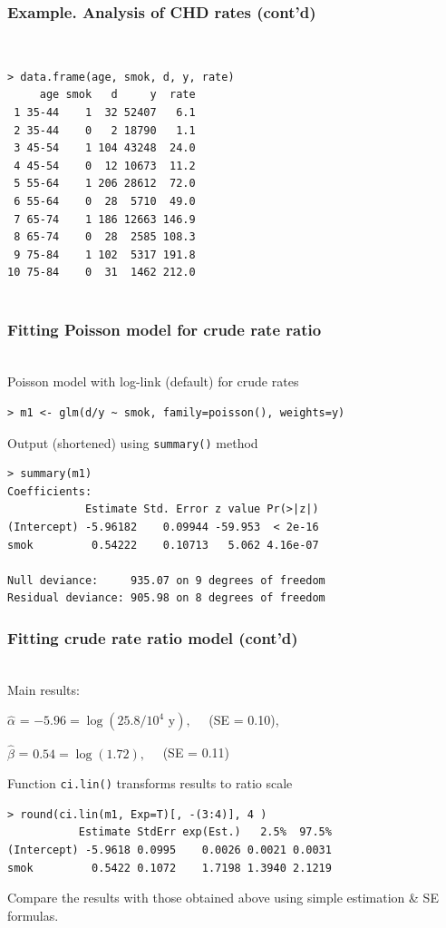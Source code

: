 \documentclass[handout, 12pt]{beamer}
\begin{document}

\begin{frame}[fragile] \frametitle{Example.  Analysis of CHD rates (cont'd)}
\ \\
\begin{verbatim}
> data.frame(age, smok, d, y, rate)
     age smok   d     y  rate
 1 35-44    1  32 52407   6.1
 2 35-44    0   2 18790   1.1
 3 45-54    1 104 43248  24.0
 4 45-54    0  12 10673  11.2
 5 55-64    1 206 28612  72.0
 6 55-64    0  28  5710  49.0
 7 65-74    1 186 12663 146.9
 8 65-74    0  28  2585 108.3
 9 75-84    1 102  5317 191.8
10 75-84    0  31  1462 212.0
 
\end{verbatim}
\end{frame} 

\begin{frame}[fragile] \frametitle{Fitting Poisson model for crude rate ratio}
\ \\
Poisson model with log-link (default) for crude rates
\begin{verbatim}
> m1 <- glm(d/y ~ smok, family=poisson(), weights=y)
\end{verbatim}
Output (shortened) using {\tt summary()} method
\small
\begin{verbatim}
> summary(m1)
Coefficients:
            Estimate Std. Error z value Pr(>|z|)
(Intercept) -5.96182    0.09944 -59.953  < 2e-16
smok         0.54222    0.10713   5.062 4.16e-07

Null deviance:     935.07 on 9 degrees of freedom
Residual deviance: 905.98 on 8 degrees of freedom
\end{verbatim}
\normalsize
\end{frame} 

\begin{frame}[fragile] 
\frametitle{Fitting crude rate ratio model (cont'd)}
\ \\
Main results: 
\bi
\item[$\widehat\alpha$] = $ -5.96 = \log(25.8/10^4 \mbox{ y}), \quad$ (SE = 0.10),
\item[$\widehat\beta$] = $0.54 = \log(1.72), \quad$ (SE = 0.11)
\ei

Function {\tt ci.lin()} transforms results to ratio scale
\small
\begin{verbatim}
> round(ci.lin(m1, Exp=T)[, -(3:4)], 4 )
           Estimate StdErr exp(Est.)   2.5%  97.5%
(Intercept) -5.9618 0.0995    0.0026 0.0021 0.0031
smok         0.5422 0.1072    1.7198 1.3940 2.1219
\end{verbatim}
\normalsize
Compare the results with those obtained above using simple
estimation \& SE formulas.
\end{frame} 
\end{document}
